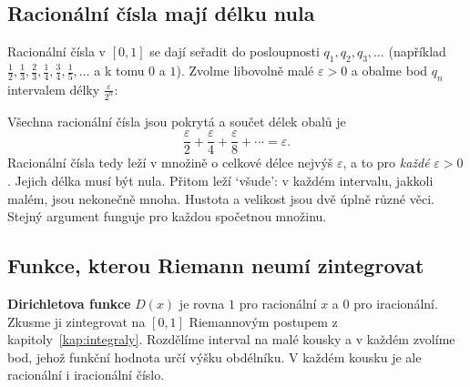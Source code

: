 \subsection{Racionální čísla mají délku nula}

Racionální čísla v $[0, 1]$ se dají seřadit do posloupnosti $q_1, q_2, q_3, \dots$ (například $\frac{1}{2}, \frac{1}{3}, \frac{2}{3}, \frac{1}{4}, \frac{3}{4}, \frac{1}{5}, \dots$ a k tomu $0$ a $1$). Zvolme libovolně malé $\varepsilon > 0$ a obalme bod $q_n$ intervalem délky $\frac{\varepsilon}{2^n}$:

\begin{center}
\end{center}

Všechna racionální čísla jsou pokrytá a součet délek obalů je
\begin{equation*}
  \frac{\varepsilon}{2} + \frac{\varepsilon}{4} + \frac{\varepsilon}{8} + \cdots = \varepsilon.
\end{equation*}
Racionální čísla tedy leží v množině o celkové délce nejvýš $\varepsilon$, a to pro \textit{každé} $\varepsilon > 0$. Jejich délka musí být nula. Přitom leží `všude': v každém intervalu, jakkoli malém, jsou nekonečně mnoha. Hustota a velikost jsou dvě úplně různé věci. Stejný argument funguje pro každou spočetnou množinu.

\subsection{Funkce, kterou Riemann neumí zintegrovat}

\textbf{Dirichletova funkce} $D(x)$ je rovna $1$ pro racionální $x$ a $0$ pro iracionální. Zkusme ji zintegrovat na $[0, 1]$ Riemannovým postupem z kapitoly~\ref{kap:integraly}. Rozdělíme interval na malé kousky a v každém zvolíme bod, jehož funkční hodnota určí výšku obdélníku. V každém kousku je ale racionální i iracionální číslo.

